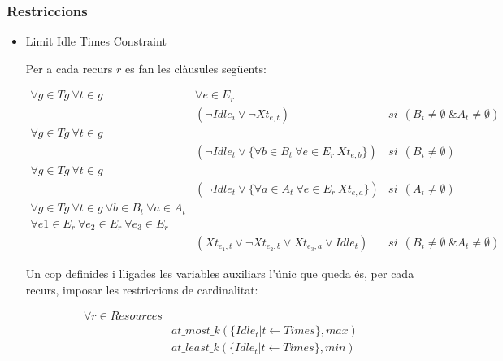 \documentclass[11pt]{beamer}
\begin{document}
  \begin{frame}
    \frametitle{Restriccions}

    \begin{itemize}
      \item Limit Idle Times Constraint

      Per a cada recurs $r$ es fan les clàusules següents:

       \begin{align*}
        \forall g \in Tg \ \forall t \in g \ &\forall e \in E_r \\
        &(\neg Idle_i \lor \neg Xt_{e, t}) & si \ \ (B_t \neq \emptyset \ \& A_t \neq \emptyset) \\
        \forall g \in Tg \ \forall t \in g  \ & \\
        & (\neg Idle_t \lor \{\forall b \in B_t \ \forall e \in E_r \ Xt_{e,b}\}) & si \ \ (B_t \neq \emptyset)\\
        \forall g \in Tg \ \forall t \in g & \\
        & (\neg Idle_t \lor \{\forall a \in A_t \ \forall e \in E_r \ Xt_{e,a}\}) & si \ \ (A_t \neq \emptyset)\\
        \forall g \in Tg \ \forall t \in g \ \forall b \in B_t \ \forall a \in A_t & \\
        \forall e1 \in E_r \ \forall e_2 \in E_r \ \forall e_3 \in E_r & \\
        & (Xt_{e_{1}, t} \lor \neg Xt_{e_2, b} \lor Xt_{e_3, a} \lor Idle_t) & si \ \ (B_t \neq \emptyset \ \& A_t \neq \emptyset)
       \end{align*}
    
       Un cop definides i lligades les variables auxiliars l'únic que queda és, per cada recurs, imposar les restriccions de cardinalitat:
    
       \begin{align*}
        \forall r \in Resources &\\
        & at\_most\_k(\{ Idle_t | t \leftarrow Times\}, max) \\
        & at\_least\_k(\{ Idle_t | t \leftarrow Times\}, min)
       \end{align*}
    \end{itemize}
  
  \end{frame}
\end{document}
